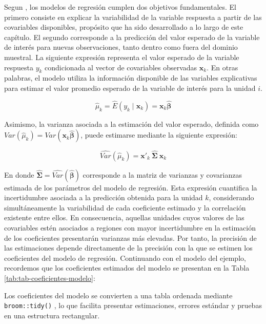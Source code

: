 \documentclass[
  spanish,
  12pt,
]{book}
\begin{document}
Segun \citet{heeringa2017applied}, los modelos de regresión cumplen dos objetivos fundamentales. El primero consiste en explicar la variabilidad de la variable respuesta a partir de las covariables disponibles, propósito que ha sido desarrollado a lo largo de este capítulo. El segundo corresponde a la predicción del valor esperado de la variable de interés para nuevas observaciones, tanto dentro como fuera del dominio muestral. La siguiente expresión representa el valor esperado de la variable respuesta \(y_k\) condicionada al vector de covariables observadas \(\mathbf{x}_{k}\). En otras palabras, el modelo utiliza la información disponible de las variables explicativas para estimar el valor promedio esperado de la variable de interés para la unidad \(i\).

\[
\hat \mu_k = \hat{E}(y_{k}\mid\mathbf{x}_{k})=\mathbf{x}_{k}\hat{\boldsymbol{\beta}}
\]

Asimismo, la varianza asociada a la estimación del valor esperado, definida como \({Var}(\hat{\mu}_k) = {Var}(\mathbf{x}_{k}\hat{\boldsymbol{\beta}})\), puede estimarse mediante la siguiente expresión:

\[
\widehat{Var}(\hat \mu_k) =
\mathbf{x}'_{k}\ \hat{\boldsymbol{\Sigma}}\ \mathbf{x}_{k}
\]

En donde \(\hat{\boldsymbol{\Sigma}}=\widehat{Var}(\hat{\boldsymbol{\beta}})\) corresponde a la matriz de varianzas y covarianzas estimada de los parámetros del modelo de regresión. Esta expresión cuantifica la incertidumbre asociada a la predicción obtenida para la unidad \(k\), considerando simultáneamente la variabilidad de cada coeficiente estimado y la correlación existente entre ellos. En consecuencia, aquellas unidades cuyos valores de las covariables estén asociados a regiones con mayor incertidumbre en la estimación de los coeficientes presentarán varianzas más elevadas. Por tanto, la precisión de las estimaciones depende directamente de la precisión con la que se estimen los coeficientes del modelo de regresión. Continuando con el modelo del ejemplo, recordemos que los coeficientes estimados del modelo se presentan en la Tabla \ref{tab:tab-coeficientes-modelo}:

Los coeficientes del modelo se convierten a una tabla ordenada mediante \texttt{broom::tidy()} \citep{broom2026}, lo que facilita presentar estimaciones, errores estándar y pruebas en una estructura rectangular.
\end{document}
